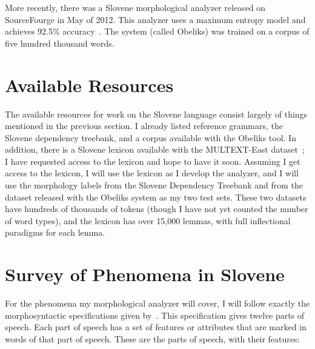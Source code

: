 \documentclass[11pt,letterpaper]{article}
\begin{document}
More recently, there was a Slovene morphological analyzer released on
SourceFourge in May of 2012.  This analyzer uses a maximum entropy model and
achieves 92.5\% accuracy~\citep{grcar-2012-obeliks}.  The system (called
Obeliks) was trained on a corpus of five hundred thousand words.

\section{Available Resources}

The available resources for work on the Slovene language consist largely of
things mentioned in the previous section.  I already listed reference grammars,
the Slovene dependency treebank, and a corpus available with the Obeliks tool.
In addition, there is a Slovene lexicon available with the MULTEXT-East
dataset~\citep{erjavec-1998-slovene-lexicon}; I have requested access to the
lexicon and hope to have it soon.  Assuming I get access to the lexicon, I will
use the lexicon as I develop the analyzer, and I will use the morphology labels
from the Slovene Dependency Treebank and from the dataset released with the
Obeliks system as my two test sets.  These two datasets have hundreds of
thousands of tokens (though I have not yet counted the number of word types),
and the lexicon has over 15,000 lemmas, with full inflectional paradigms for
each lemma.

\section{Survey of Phenomena in Slovene}

For the phenomena my morphological analyzer will cover, I will follow exactly
the morphosyntactic specifications given by~\cite{erjavec-mds}.  This
specification gives twelve parts of speech.  Each part of speech has a set of
features or attributes that are marked in words of that part of speech.  These
are the parts of speech, with their features:
\end{document}
